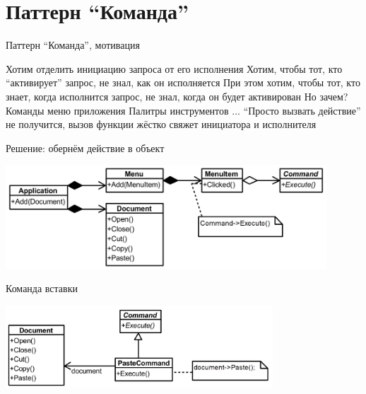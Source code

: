 \documentclass{../../slides-style}
\begin{document}
    \begin{frame}[plain]
        \titlepage
    \end{frame}

    \section{Паттерн \enquote{Команда}}

    \begin{frame}{Паттерн \enquote{Команда}, мотивация}
        \begin{outline}
            \1 Хотим отделить инициацию запроса от его исполнения
            \1 Хотим, чтобы тот, кто \enquote{активирует} запрос, не знал, как он исполняется
            \1 При этом хотим, чтобы тот, кто знает, когда исполнится запрос, не знал, когда он будет активирован
            \1 Но зачем?
                \2 Команды меню приложения
                \2 Палитры инструментов
                \2 ...
            \1 \enquote{Просто вызвать действие} не получится, вызов функции жёстко свяжет инициатора и исполнителя
        \end{outline}
    \end{frame}

    \begin{frame}{Решение: обернём действие в объект}
        \begin{center}
            \includegraphics[width=0.9\textwidth]{commandExample.png}
        \end{center}
    \end{frame}

    \begin{frame}{Команда вставки}
        \begin{center}
            \includegraphics[width=0.75\textwidth]{pasteCommand.png}
        \end{center}
    \end{frame}
\end{document}
